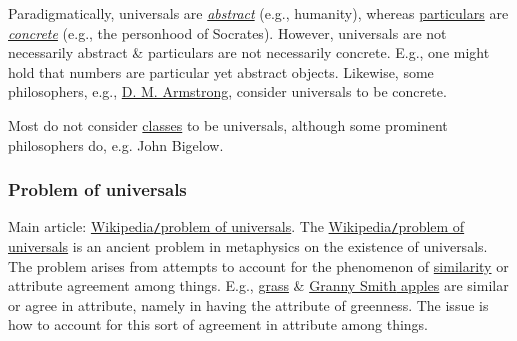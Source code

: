 \documentclass{article}
\begin{document}
Paradigmatically, universals are \href{https://en.wikipedia.org/wiki/Abstract_(philosophy)}{\it abstract} (e.g., humanity), whereas \href{https://en.wikipedia.org/wiki/Particular}{particulars} are \href{https://en.wikipedia.org/wiki/Concrete_(philosophy)}{\it concrete} (e.g., the personhood of Socrates). However, universals are not necessarily abstract \& particulars are not necessarily concrete. E.g., one might hold that numbers are particular yet abstract objects. Likewise, some philosophers, e.g., \href{https://en.wikipedia.org/wiki/David_Malet_Armstrong}{\sc D. M. Armstrong}, consider universals to be concrete.

Most do not consider \href{https://en.wikipedia.org/wiki/Class_(philosophy)}{classes} to be universals, although some prominent philosophers do, e.g. {\sc John Bigelow}.

\subsubsection{Problem of universals}
Main article: \href{https://en.wikipedia.org/wiki/Problem_of_universals}{Wikipedia{\tt/}problem of universals}. The \href{https://en.wikipedia.org/wiki/Problem_of_universals}{Wikipedia{\tt/}problem of universals} is an ancient problem in metaphysics on the existence of universals. The problem arises from attempts to account for the phenomenon of \href{https://en.wikipedia.org/wiki/Similarity_(philosophy)}{similarity} or attribute agreement among things. E.g., \href{https://en.wikipedia.org/wiki/Grass}{grass} \& \href{https://en.wikipedia.org/wiki/Granny_Smith}{{\sc Granny Smith} apples} are similar or agree in attribute, namely in having the attribute of greenness. The issue is how to account for this sort of agreement in attribute among things.
\end{document}
